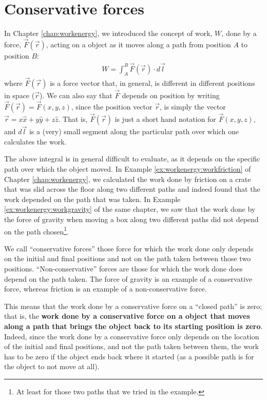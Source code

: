 \section{Conservative forces}
In Chapter \ref{chap:workenergy}, we introduced the concept of work, $W$, done by a force, $\vec F(\vec r)$, acting on a object as it moves along a path from position $A$ to position $B$:
\begin{align}
\label{eq:potentialecons:workdef}
W = \int_A^B \vec F(\vec r) \cdot d\vec l
\end{align}
where $\vec F(\vec r)$ is a force vector that, in general, is different in different positions in space ($\vec r$). We can also say that $\vec F$ depends on position by writing $\vec F(\vec r)=\vec F(x,y,z)$, since the position vector $\vec r$, is simply the vector $\vec r = x\hat x + y \hat y+ z\hat z$. That is, $\vec F(\vec r)$ is just a short hand notation for $\vec F(x,y,z)$, and $d\vec l$ is a (very) small segment along the particular path over which one calculates the work.

The above integral is in general difficult to evaluate, as it depends on the specific path over which the object moved. In Example \ref{ex:workenergy:workfriction} of Chapter \ref{chap:workenergy}, we calculated the work done by friction on a crate that was slid across the floor along two different paths and indeed found that the work depended on the path that was taken. In Example \ref{ex:workenergy:workgravity} of the same chapter, we saw that the work done by the force of gravity when moving a box along two different paths did not depend on the path chosen\footnote{At least for those two paths that we tried in the example.}.

We call ``conservative forces'' those force for which the work done only depends on the initial and final positions and not on the path taken between those two positions. ``Non-conservative'' forces are those for which the work done does depend on the path taken. The force of gravity is an example of a conservative force, whereas friction is an example of a non-conservative force.

This means that the work done by a conservative force on a ``closed path'' is zero; that is, the \textbf{work done by a conservative force on a object that moves along a path that brings the object back to its starting position is zero}. Indeed, since the work done by a conservative force only depends on the location of the initial and final positions, and not the path taken between them, the work has to be zero if the object ends back where it started (as a possible path is for the object to not move at all).


